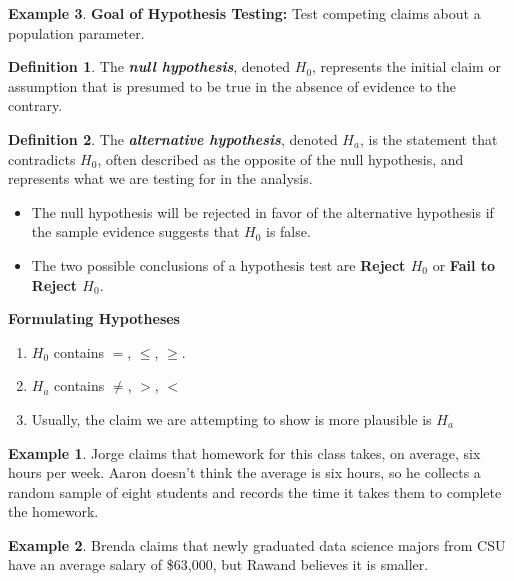 \documentclass[
  11pt,
  oneside]{book}
\providecommand{\tightlist}{%
  \setlength{\itemsep}{0pt}\setlength{\parskip}{0pt}}
\theoremstyle{definition}
\newtheorem{definition}{Definition}[chapter]
\theoremstyle{definition}
\newtheorem{example}{Example}[chapter]
\theoremstyle{definition}
\theoremstyle{definition}
\theoremstyle{remark}
\begin{document}
\begin{example}
\textbf{Goal of Hypothesis Testing:} Test competing claims about a population parameter.

\newpage

\begin{definition}
The \textbf{\emph{null hypothesis}}, denoted \(H_0\), represents the initial claim or assumption that is presumed to be true in the absence of evidence to the contrary.
\end{definition}

\begin{definition}
The \textbf{\emph{alternative hypothesis}}, denoted \(H_a\), is the statement that contradicts \(H_0\), often described as the opposite of the null hypothesis, and represents what we are testing for in the analysis.
\end{definition}

\begin{itemize}
\item
  The null hypothesis will be rejected in favor of the alternative hypothesis if the sample evidence suggests that \(H_0\) is false.
\item
  The two possible conclusions of a hypothesis test are \textbf{Reject \(H_0\)} or \textbf{Fail to Reject \(H_0\)}.
\end{itemize}

\textbf{Formulating Hypotheses}

\begin{enumerate}
\def\labelenumi{\arabic{enumi}.}
\tightlist
\item
  \(H_0\) contains \(=\), \(\leq\), \(\geq\).
\item
  \(H_a\) contains \(\neq\), \(>\), \(<\)
\item
  Usually, the claim we are attempting to show is more plausible is \(H_a\)
\end{enumerate}

\begin{example}
Jorge claims that homework for this class takes, on average, six hours per week. Aaron doesn't think the average is six hours, so he collects a random sample of eight students and records the time it takes them to complete the homework.
\end{example}

\vfill

\begin{example}
Brenda claims that newly graduated data science majors from CSU have an average salary of \$63,000, but Rawand believes it is smaller.
\end{example}


\end{example}
\end{document}
